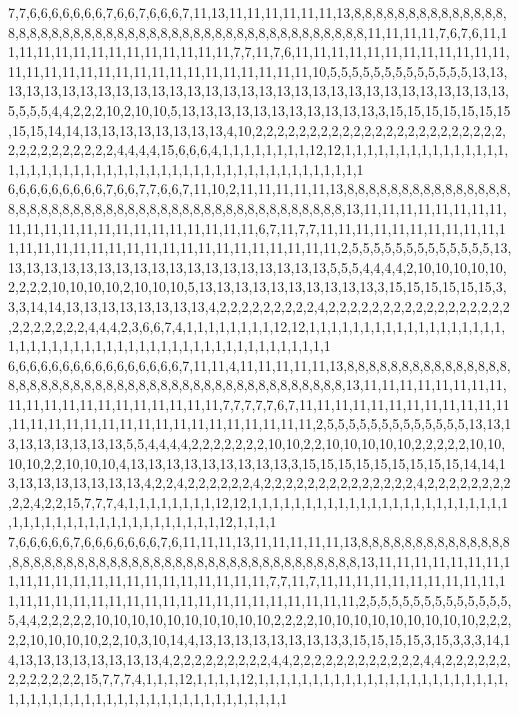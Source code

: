7,7,6,6,6,6,6,6,6,7,6,6,7,6,6,6,7,11,13,11,11,11,11,11,11,13,8,8,8,8,8,8,8,8,8,8,8,8,8,8,8,8,8,8,8,8,8,8,8,8,8,8,8,8,8,8,8,8,8,8,8,8,8,8,8,8,8,8,8,8,8,8,8,11,11,11,11,7,6,7,6,11,11,11,11,11,11,11,11,11,11,11,11,11,11,7,7,11,7,6,11,11,11,11,11,11,11,11,11,11,11,11,11,11,11,11,11,11,11,11,11,11,11,11,11,11,11,11,11,10,5,5,5,5,5,5,5,5,5,5,5,5,5,13,13,13,13,13,13,13,13,13,13,13,13,13,13,13,13,13,13,13,13,13,13,13,13,13,13,13,13,13,13,5,5,5,5,4,4,2,2,2,10,2,10,10,5,13,13,13,13,13,13,13,13,13,13,13,3,15,15,15,15,15,15,15,15,15,14,14,13,13,13,13,13,13,13,13,4,10,2,2,2,2,2,2,2,2,2,2,2,2,2,2,2,2,2,2,2,2,2,2,2,2,2,2,2,2,2,2,2,2,2,4,4,4,4,15,6,6,6,4,1,1,1,1,1,1,1,1,12,12,1,1,1,1,1,1,1,1,1,1,1,1,1,1,1,1,1,1,1,1,1,1,1,1,1,1,1,1,1,1,1,1,1,1,1,1,1,1,1,1,1,1,1,1,1,1,1,1
6,6,6,6,6,6,6,6,6,7,6,6,7,7,6,6,7,11,10,2,11,11,11,11,11,13,8,8,8,8,8,8,8,8,8,8,8,8,8,8,8,8,8,8,8,8,8,8,8,8,8,8,8,8,8,8,8,8,8,8,8,8,8,8,8,8,8,8,8,8,8,8,13,11,11,11,11,11,11,11,11,11,11,11,11,11,11,11,11,11,11,11,11,11,11,6,7,11,7,7,11,11,11,11,11,11,11,11,11,11,11,11,11,11,11,11,11,11,11,11,11,11,11,11,11,11,11,11,11,2,5,5,5,5,5,5,5,5,5,5,5,5,5,13,13,13,13,13,13,13,13,13,13,13,13,13,13,13,13,13,13,13,5,5,5,4,4,4,4,2,10,10,10,10,10,2,2,2,2,10,10,10,10,2,10,10,10,5,13,13,13,13,13,13,13,13,13,13,3,15,15,15,15,15,15,3,3,3,14,14,13,13,13,13,13,13,13,13,4,2,2,2,2,2,2,2,2,2,4,2,2,2,2,2,2,2,2,2,2,2,2,2,2,2,2,2,2,2,2,2,2,2,2,4,4,4,2,3,6,6,7,4,1,1,1,1,1,1,1,1,12,12,1,1,1,1,1,1,1,1,1,1,1,1,1,1,1,1,1,1,1,1,1,1,1,1,1,1,1,1,1,1,1,1,1,1,1,1,1,1,1,1,1,1,1,1,1,1,1,1
6,6,6,6,6,6,6,6,6,6,6,6,6,6,6,6,7,11,11,4,11,11,11,11,11,13,8,8,8,8,8,8,8,8,8,8,8,8,8,8,8,8,8,8,8,8,8,8,8,8,8,8,8,8,8,8,8,8,8,8,8,8,8,8,8,8,8,8,8,8,8,8,13,11,11,11,11,11,11,11,11,11,11,11,11,11,11,11,11,11,11,11,11,7,7,7,7,7,6,7,11,11,11,11,11,11,11,11,11,11,11,11,11,11,11,11,11,11,11,11,11,11,11,11,11,11,11,11,11,2,5,5,5,5,5,5,5,5,5,5,5,5,5,13,13,13,13,13,13,13,13,13,5,5,4,4,4,4,2,2,2,2,2,2,2,10,10,2,2,10,10,10,10,10,2,2,2,2,2,10,10,10,10,2,2,10,10,10,4,13,13,13,13,13,13,13,13,13,3,15,15,15,15,15,15,15,15,15,14,14,13,13,13,13,13,13,13,13,4,2,2,4,2,2,2,2,2,2,4,2,2,2,2,2,2,2,2,2,2,2,2,2,2,4,2,2,2,2,2,2,2,2,2,2,4,2,2,15,7,7,7,4,1,1,1,1,1,1,1,1,12,12,1,1,1,1,1,1,1,1,1,1,1,1,1,1,1,1,1,1,1,1,1,1,1,1,1,1,1,1,1,1,1,1,1,1,1,1,1,1,1,1,1,1,1,12,1,1,1,1
7,6,6,6,6,6,7,6,6,6,6,6,6,6,7,6,11,11,11,13,11,11,11,11,11,13,8,8,8,8,8,8,8,8,8,8,8,8,8,8,8,8,8,8,8,8,8,8,8,8,8,8,8,8,8,8,8,8,8,8,8,8,8,8,8,8,8,8,8,8,8,8,13,11,11,11,11,11,11,11,11,11,11,11,11,11,11,11,11,11,11,11,11,11,11,7,7,11,7,11,11,11,11,11,11,11,11,11,11,11,11,11,11,11,11,11,11,11,11,11,11,11,11,11,11,11,11,11,11,2,5,5,5,5,5,5,5,5,5,5,5,5,5,5,4,4,2,2,2,2,2,10,10,10,10,10,10,10,10,10,10,2,2,2,2,10,10,10,10,10,10,10,10,10,2,2,2,2,2,10,10,10,10,2,2,10,3,10,14,4,13,13,13,13,13,13,13,13,3,15,15,15,15,3,15,3,3,3,14,14,13,13,13,13,13,13,13,13,4,2,2,2,2,2,2,2,2,2,4,4,2,2,2,2,2,2,2,2,2,2,2,2,4,4,2,2,2,2,2,2,2,2,2,2,2,2,2,15,7,7,7,4,1,1,1,12,1,1,1,1,12,1,1,1,1,1,1,1,1,1,1,1,1,1,1,1,1,1,1,1,1,1,1,1,1,1,1,1,1,1,1,1,1,1,1,1,1,1,1,1,1,1,1,1,1,1,1,1,1,1
